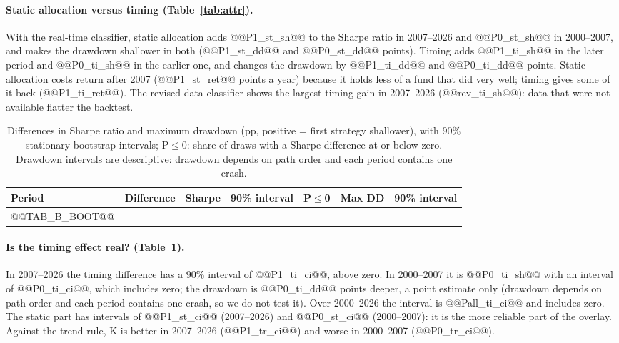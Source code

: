 \documentclass[11pt,a4paper]{article}
\begin{document}
\paragraph{Static allocation versus timing (Table~\ref{tab:attr}).} With the real-time classifier, static
allocation adds @@P1_st_sh@@ to the Sharpe ratio in 2007--2026 and @@P0_st_sh@@ in 2000--2007, and makes the
drawdown shallower in both (@@P1_st_dd@@ and @@P0_st_dd@@ points). Timing adds @@P1_ti_sh@@ in the later period
and @@P0_ti_sh@@ in the earlier one, and changes the drawdown by @@P1_ti_dd@@ and @@P0_ti_dd@@ points. Static
allocation costs return after 2007 (@@P1_st_ret@@ points a year) because it holds less of a fund that did very
well; timing gives some of it back (@@P1_ti_ret@@). The revised-data classifier shows the largest timing gain in
2007--2026 (@@rev_ti_sh@@): data that were not available flatter the backtest.

\begin{table}[htbp]
\centering
\caption{Differences in Sharpe ratio and maximum drawdown (pp, positive = first strategy shallower), with 90\%
stationary-bootstrap intervals; P$\le$0: share of draws with a Sharpe difference at or below zero. Drawdown
intervals are descriptive: drawdown depends on path order and each period contains one crash.}
\label{tab:boot}
\footnotesize
\setlength{\tabcolsep}{4pt}
\begin{tabular}{@{}llrrrrr@{}}
\toprule
Period & Difference & Sharpe & 90\% interval & P$\le$0 & Max DD & 90\% interval \\
\midrule
@@TAB_B_BOOT@@
\bottomrule
\end{tabular}
\end{table}

\paragraph{Is the timing effect real? (Table~\ref{tab:boot}).} In 2007--2026 the timing difference has a 90\%
interval of @@P1_ti_ci@@, above zero. In 2000--2007 it is @@P0_ti_sh@@ with an interval of @@P0_ti_ci@@, which includes zero; the drawdown is
@@P0_ti_dd@@ points deeper, a point estimate only (drawdown depends on path order and each period contains one
crash, so we do not test it). Over 2000--2026
the interval is @@Pall_ti_ci@@ and includes zero. The static part has intervals of @@P1_st_ci@@ (2007--2026) and
@@P0_st_ci@@ (2000--2007): it is the more reliable part of the overlay. Against the trend rule, K is better in
2007--2026 (@@P1_tr_ci@@) and worse in 2000--2007 (@@P0_tr_ci@@).
\end{document}

